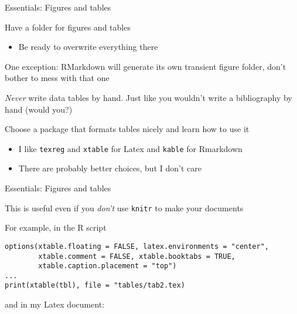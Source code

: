 \documentclass{hertieteaching}
\begin{document}
\begin{frame}{Essentials: Figures and tables}

Have a folder for figures and tables
\begin{itemize}
  \item Be ready to overwrite everything there
\end{itemize}
One exception: \textsf{RMarkdown} will generate its own transient figure folder, don't bother to mess with that one

\textit{Never} write data tables by hand. Just like you wouldn't write a bibliography by hand (would you?)

Choose a package that formats tables nicely and learn how to use it
\begin{itemize}
  \item I like \texttt{texreg} and \texttt{xtable} for Latex and \texttt{kable} for Rmarkdown
  \item There are probably better choices, but I don't care
\end{itemize}

\end{frame}

\begin{frame}[fragile]{Essentials: Figures and tables}

This is useful even if you \textit{don't} use \texttt{knitr} to make your documents

For example, in the R script
\begin{verbatim}
options(xtable.floating = FALSE, latex.environments = "center",
        xtable.comment = FALSE, xtable.booktabs = TRUE,
        xtable.caption.placement = "top")
...
print(xtable(tbl), file = "tables/tab2.tex) 
\end{verbatim}
and in my Latex document:
\begin{verbatim}

\end{verbatim}
\end{frame}
\end{document}

